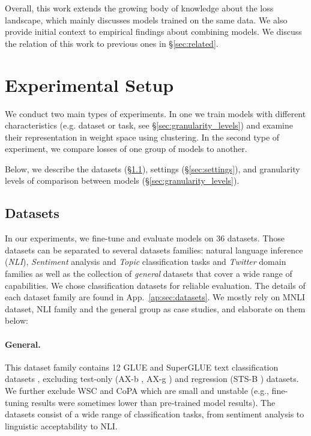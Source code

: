 \documentclass[nohyperref]{article}
\theoremstyle{plain}
\theoremstyle{definition}
\theoremstyle{remark}
\begin{document}
Overall, this work extends the growing body of knowledge about the loss landscape, which mainly discusses models trained on the same data. We also provide initial context to empirical findings about combining models. We discuss the relation of this work to previous ones in \S\ref{sec:related}.


\section{Experimental Setup}
We conduct two main types of experiments. In one we train models with different characteristics (e.g. dataset or task, see \S\ref{sec:granularity_levels}) and examine their representation in weight space using clustering. In the second type of experiment, we compare losses of one group of models to another.

Below, we describe the datasets (\S\ref{sec:datasets}), settings (\S\ref{sec:settings}), and granularity levels of comparison between models (\S\ref{sec:granularity_levels}).


\subsection{Datasets}\label{sec:datasets}
In our experiments, we fine-tune and evaluate models on 36 datasets. Those datasets can be separated to several datasets families: natural language inference (\emph{NLI}), \emph{Sentiment} analysis and \emph{Topic} classification tasks and \emph{Twitter} domain families as well as the collection of \emph{general} datasets that cover a wide range of capabilities. We chose classification datasets for reliable evaluation. The details of each dataset family are found in App.~\ref{ap:sec:datasets}. We mostly rely on MNLI \citep{williams2018broad} dataset, NLI family and the general group as case studies, and elaborate on them below:

\paragraph{General.} This dataset family contains 12 GLUE \citep{wang-etal-2018-glue} and SuperGLUE text classification datasets \citep{Wang2019SuperGLUEAS}, excluding test-only (AX-b \citep{Wang2019SuperGLUEAS}, AX-g \citep{Poliak2018CollectingDN}) and regression (STS-B \citep{Cer2017SemEval2017T1}) datasets. We further exclude WSC \citep{levesque2012winograd} and CoPA \citep{roemmele2011choice} which are small and unstable (e.g., fine-tuning results were sometimes lower than pre-trained model results). The datasets consist of a wide range of classification tasks, from sentiment analysis to linguistic acceptability to NLI.
\end{document}
